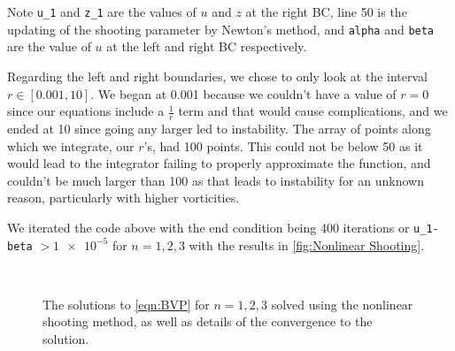 \documentclass[12pt]{article}
\numberwithin{equation}{section}
\numberwithin{figure}{section}
\numberwithin{table}{section}
\begin{document}


\par Note \texttt{u\_1} and \texttt{z\_1} are the values of $u$ and $z$ at the right BC, line 50 is the updating of the shooting parameter by Newton's method, and \texttt{alpha} and \texttt{beta} are the value of $u$ at the left and right BC respectively. 
\par Regarding the left and right boundaries, we chose to only look at the interval $r\in[0.001,10]$. We began at 0.001 because we couldn't have a value of $r=0$ since our equations include a $\frac{1}{r}$ term and that would cause complications, and we ended at 10 since going any larger led to instability. The array of points along which we integrate, our $r$'s, had 100 points. This could not be below 50 as it would lead to the integrator failing to properly approximate the function, and couldn't be much larger than 100 as that leads to instability for an unknown reason, particularly with higher vorticities. 
\par We iterated the code above with the end condition being 400 iterations or \texttt{u\_1-beta} $>\num{1e-5}$ for $n=1,2,3$ with the results in \autoref{fig:Nonlinear Shooting}.

\begin{figure}[h]
    \centering
    \,
    \caption{The solutions to \autoref{eqn:BVP} for $n=1,2,3$ solved using the nonlinear shooting method, as well as details of the convergence to the solution.}
    \label{fig:Nonlinear Shooting}
\end{figure}
\end{document}
